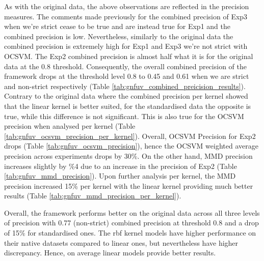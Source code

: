 \documentclass{mpaper}
\begin{document}
As with the original data, the above observations are reflected in the precision measures. The comments made previously for the combined precision of Exp3 when we're strict cease to be true and are instead true for Exp1 and the combined precision is low. Nevertheless, similarly to the original data the combined precision is extremely high for Exp1 and Exp3 we're not strict with OCSVM. The Exp2 combined precision is almost half what it is for the original data at the 0.8 threshold. Consequently, the overall combined precision of the framework drops at the threshold level 0.8 to 0.45 and 0.61 when we are strict and non-strict respectively (Table \ref{tab:gnfuv_combined_preicision_results}). Contrary to the original data where the combined precision per kernel showed that the linear kernel is better suited, for the standardised data the opposite is true, while this difference is not significant. This is also true for the OCSVM precision when analysed per kernel (Table \ref{tab:gnfuv_ocsvm_precision_per_kernel}).  Overall, OCSVM Precision for Exp2 drops (Table \ref{tab:gnfuv_ocsvm_precision}), hence the OCSVM weighted average precision across experiments drops by 30\%. On the other hand, MMD precision increases slightly by \%4 due to an increase in the precision of Exp2 (Table \ref{tab:gnfuv_mmd_precision}). Upon further analysis per kernel, the MMD precision increased 15\% per kernel with the linear kernel providing much better results (Table \ref{tab:gnfuv_mmd_precision_per_kernel}).

Overall, the framework performs better on the original data across all three levels of precision with 0.77 (non-strict) combined precision at threshold 0.8 and a drop of 15\% for standardised ones. The rbf kernel models have higher performance on their native datasets compared to linear ones, but nevertheless have higher discrepancy. Hence, on average linear models provide better results.  
\end{document}
